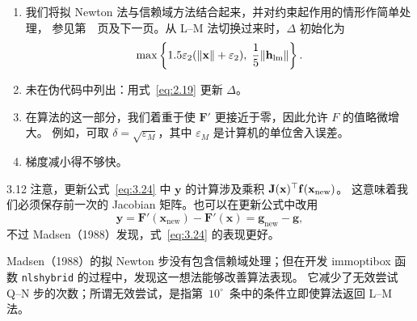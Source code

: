 \begin{enumerate}[label=\(\arabic*^{\circ}\),start=7,leftmargin=2.8em]
  \item 我们将拟 Newton 法与信赖域方法结合起来，并对约束起作用的情形作简单处理，
        参见第~\pageref{src:15}~页及下一页。从 L--M 法切换过来时，$\Delta$ 初始化为
        \[
          \max\left\{1.5\varepsilon_2(\lVert\mathbf{x}\rVert+\varepsilon_2),\;
                      \frac{1}{5}\lVert\mathbf{h}_{\mathrm{lm}}\rVert\right\}.
        \]
  \item 未在伪代码中列出：用式~\eqref{eq:2.19} 更新 $\Delta$。
  \item 在算法的这一部分，我们着重于使 $\mathbf{F}'$ 更接近于零，因此允许 $F$ 的值略微增大。
        例如，可取 $\delta=\sqrt{\varepsilon_M}$，其中 $\varepsilon_M$ 是计算机的单位舍入误差。
  \item 梯度减小得不够快。
\end{enumerate}

\begin{example}{3.12}
注意，更新公式~\eqref{eq:3.24} 中 $\mathbf{y}$ 的计算涉及乘积
$\mathbf{J}(\mathbf{x})^{\top}\mathbf{f}(\mathbf{x}_{\mathrm{new}})$。
这意味着我们必须保存前一次的 Jacobian 矩阵。也可以在更新公式中改用
\[
  \mathbf{y}=\mathbf{F}'(\mathbf{x}_{\mathrm{new}})-\mathbf{F}'(\mathbf{x})=\mathbf{g}_{\mathrm{new}}-\mathbf{g},
\]
不过 Madsen（1988）发现，式~\eqref{eq:3.24} 的表现更好。

Madsen（1988）的拟 Newton 步没有包含信赖域处理；但在开发 immoptibox 函数
\texttt{nlshybrid} 的过程中，发现这一想法能够改善算法表现。
它减少了无效尝试 Q--N 步的次数；所谓无效尝试，是指第~$10^{\circ}$~条中的条件立即使算法返回 L--M 法。
\end{example}

